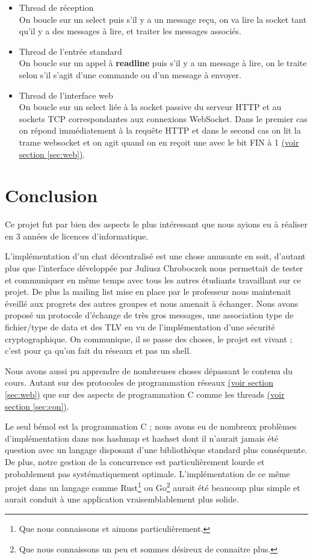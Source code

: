 \documentclass[a4paper,10pt]{article} %
\begin{document}
\begin{itemize}
\item Thread de réception \\
  On boucle sur un select puis s'il y a un message reçu, on va lire la socket tant qu'il y a des messages à lire, et traiter les messages associés.
\item Thread de l'entrée standard \\
  On boucle sur un appel à \textbf{readline} puis s'il y a un message à lire, on le traite selon s'il s'agit d'une commande ou d'un message à envoyer.
\item Thread de l'interface web \\
  On boucle sur un select liée à la socket passive du serveur \textrm{HTTP} et au sockets \textrm{TCP} correspondantes aux connexions WebSocket. Dans le premier cas on répond immédiatement à la requête \textrm{HTTP} et dans le second cas on lit la trame websocket et on agit quand on en reçoit une avec le bit \textrm{FIN} à 1 \hyperref[sec:web]{(voir section \ref{sec:web})}.
\end{itemize}

\section{Conclusion}

Ce projet fut par bien des aspects le plus intéressant que nous ayions eu à réaliser en 3 années de licences d'informatique.

L'implémentation d'un chat décentralisé est une chose amusante en soit, d'autant plus que l'interface développée par Juliusz Chroboczek nous permettait de tester et communiquer en même temps avec tous les autres étudiants travaillant sur ce projet. De plus la mailing list mise en place par le professeur nous maintenait éveillé aux progrets des autres groupes et nous amenait à échanger. Nous avons proposé un protocole d'échange de très gros messages, une association type de fichier/type de data et des TLV en vu de l'implémentation d'une sécurité cryptographique. On communique, il se passe des choses, le projet est vivant ; c'est pour ça qu'on fait du réseaux et pas un shell.

Nous avons aussi pu apprendre de nombreuses choses dépassant le contenu du cours. Autant sur des protocoles de programmation réseaux \hyperref[sec:web]{(voir section \ref{sec:web})} que sur des aspects de programmation C comme les threads \hyperref[sec:con]{(voir section \ref{sec:con})}.

Le seul bémol est la programmation C ; nous avons eu de nombreux problèmes d'implémentation dans nos hashmap et hashset dont il n'aurait jamais été question avec un langage disposant d'une bibliothèque standard plus conséquente. De plus, notre gestion de la concurrence est particulièrement lourde et probablement pas systématiquement optimale. L'implémentation de ce même projet dans un langage comme \textrm{Rust}\footnote{Que nous connaissons et aimons particulièrement.} ou \textrm{Go}\footnote{Que nous connaissons un peu et sommes désireux de connaitre plus.} aurait été beaucoup plus simple et aurait conduit à une application vraisemblablement plus solide.
\end{document}
